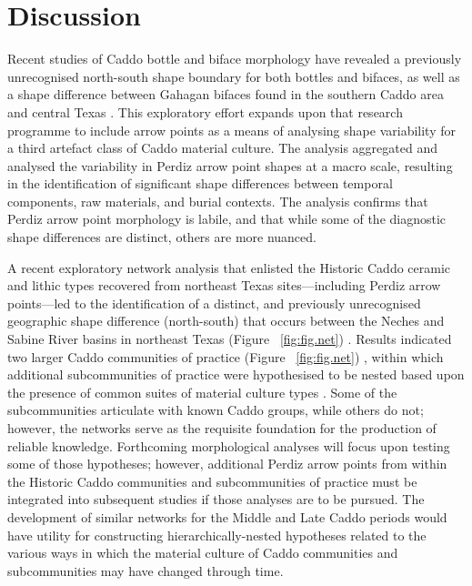 \documentclass[review]{elsarticle}
\begin{document}
\section*{Discussion}

Recent studies of Caddo bottle and biface morphology have revealed a previously unrecognised north-south shape boundary for both bottles and bifaces, as well as a shape difference between Gahagan bifaces found in the southern Caddo area and central Texas \citep{RN8074,RN7927,RN8158,RN8370,RN8322,RN8312}. This exploratory effort expands upon that research programme to include arrow points as a means of analysing shape variability for a third artefact class of Caddo material culture. The analysis aggregated and analysed the variability in Perdiz arrow point shapes at a macro scale, resulting in the identification of significant shape differences between temporal components, raw materials, and burial contexts. The analysis confirms that Perdiz arrow point morphology is labile, and that while some of the diagnostic shape differences are distinct, others are more nuanced.

A recent exploratory network analysis that enlisted the Historic Caddo ceramic and lithic types recovered from northeast Texas sites---including Perdiz arrow points---led to the identification of a distinct, and previously unrecognised geographic shape difference (north-south) that occurs between the Neches and Sabine River basins in northeast Texas (Figure ~\ref{fig:fig.net}) \citep{RN8031}. Results indicated two larger Caddo communities of practice (Figure ~\ref{fig:fig.net}) \citep[Figure 16.4]{RN8031}, within which additional subcommunities of practice were hypothesised to be nested based upon the presence of common suites of material culture types \citep[Figures 16.5 and 16.6]{RN8031}. Some of the subcommunities articulate with known Caddo groups, while others do not; however, the networks serve as the requisite foundation for the production of reliable knowledge. Forthcoming morphological analyses will focus upon testing some of those hypotheses; however, additional Perdiz arrow points from within the Historic Caddo communities and subcommunities of practice must be integrated into subsequent studies if those analyses are to be pursued. The development of similar networks for the Middle and Late Caddo periods would have utility for constructing hierarchically-nested hypotheses related to the various ways in which the material culture of Caddo communities and subcommunities may have changed through time.
\end{document}
